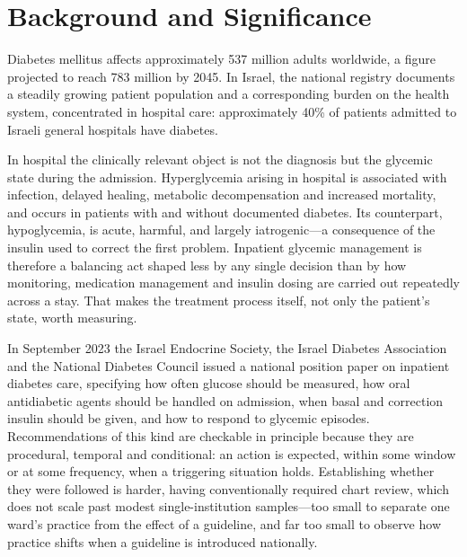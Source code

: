 \section{Background and Significance}
\label{sec:background}

Diabetes mellitus affects approximately 537 million adults worldwide, a figure
projected to reach 783 million by 2045.\citep{idf-atlas-10th-edition-2021} In
Israel, the national registry documents a steadily growing patient population
and a corresponding burden on the health system,\citep{israel-national-center-disease-control-diabetes-registry-report-2012-2022,
summary-cost-diabetes-israel-2018} concentrated in hospital care:
approximately 40\% of patients admitted to Israeli general hospitals have
diabetes.\citep{hochberg2023inpatient}

In hospital the clinically relevant object is not the diagnosis but the
glycemic state during the admission. Hyperglycemia arising in hospital is
associated with infection, delayed healing, metabolic decompensation and
increased mortality, and occurs in patients with and without documented
diabetes. Its counterpart, hypoglycemia, is acute, harmful, and largely
iatrogenic---a consequence of the insulin used to correct the first problem.
Inpatient glycemic management is therefore a balancing act shaped less by any
single decision than by how monitoring, medication management and insulin
dosing are carried out repeatedly across a stay. That makes the treatment
process itself, not only the patient's state, worth measuring.

In September 2023 the Israel Endocrine Society, the Israel Diabetes Association
and the National Diabetes Council issued a national position paper on inpatient
diabetes care,\citep{hochberg2023inpatient} specifying how often glucose
should be measured, how oral antidiabetic agents should be handled on
admission, when basal and correction insulin should be given, and how to
respond to glycemic episodes. Recommendations of this kind are checkable in
principle because they are procedural, temporal and conditional: an action is
expected, within some window or at some frequency, when a triggering situation
holds. Establishing whether they were followed is harder, having conventionally
required chart review, which does not scale past modest single-institution
samples---too small to separate one ward's practice from the effect of a
guideline, and far too small to observe how practice shifts when a guideline is
introduced nationally.

